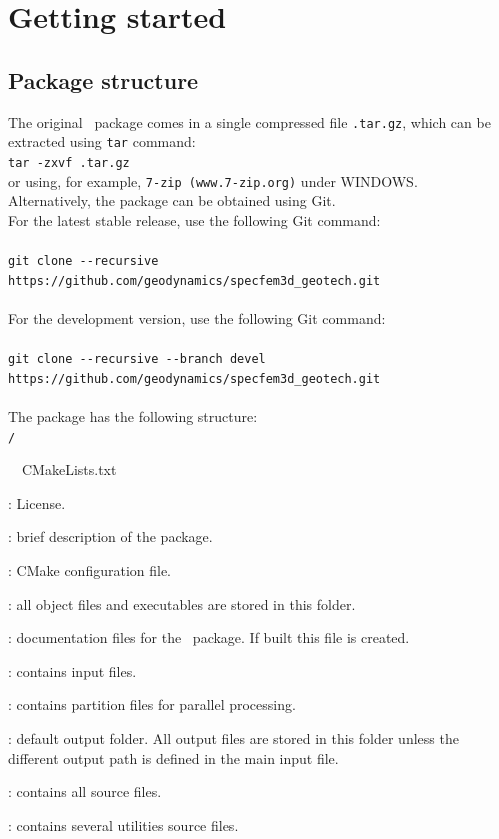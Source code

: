 \chapter{Getting started}
\label{chap:start}
\section{Package structure}
The original \pack\ package comes in a single compressed file \linebreak\texttt{\pack.tar.gz}, which can be extracted using \texttt{tar} command:\\

\texttt{tar -zxvf \pack.tar.gz}\\

or using, for example, \texttt{7-zip (www.7-zip.org)} under WINDOWS.\\

Alternatively, the package can be obtained using Git.\\

For the latest stable release, use the following Git command:\\
\\
\texttt{git clone -{}-recursive https://github.com/geodynamics/specfem3d\_geotech.git}\\
\\
For the development version, use the following Git command:\\
\\
\texttt{git clone -{}-recursive -{}-branch devel https://github.com/geodynamics/specfem3d\_geotech.git}\\
\\
The package has the following structure:\\



\texttt{\pack/}
\begin{adescription}{~~CMakeLists.txt}
\item[~~COPYING]               : License.
\item[~~README]                : brief description of the package.
\item[~~CMakeLists.txt]        : CMake configuration file.
\item[~~bin/]                  : all object files and executables are stored in this folder.
\item[~~doc/]                  : documentation files for the \pack\ package. If built this file is created.
\item[~~input/]                : contains input files.
\item[~~partition/]            : contains partition files for parallel processing.
\item[~~output/]               : default output folder. All output files are stored in this folder unless the different output path is defined in the main input file.
\item[~~src/]                  : contains all source files.
\item[~~util/]                 : contains several utilities source files.
\end{adescription}

